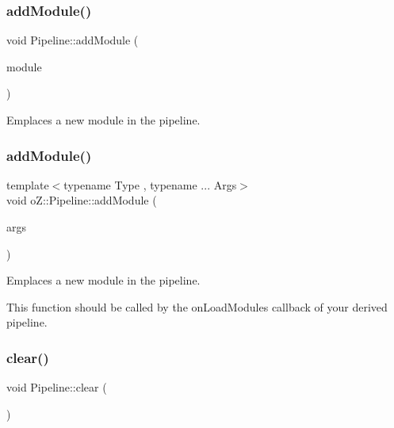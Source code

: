 \subsubsection{\texorpdfstring{addModule()}{addModule()}\hspace{0.1cm}{\footnotesize\ttfamily [1/2]}}
{\footnotesize\ttfamily void Pipeline\+::add\+Module (\begin{DoxyParamCaption}\item[{\mbox{\hyperlink{namespaceo_z_af5a56aaaee027504979038f38991adcf}{Module\+Ptr}} \&\&}]{module }\end{DoxyParamCaption})}



Emplaces a new module in the pipeline. 

\mbox{\label{classo_z_1_1_pipeline_a797f98947aace930fbb15cd6b2d9f726}} 
\subsubsection{\texorpdfstring{addModule()}{addModule()}\hspace{0.1cm}{\footnotesize\ttfamily [2/2]}}
{\footnotesize\ttfamily template$<$typename Type , typename ... Args$>$ \\
void o\+Z\+::\+Pipeline\+::add\+Module (\begin{DoxyParamCaption}\item[{Args \&\&...}]{args }\end{DoxyParamCaption})}



Emplaces a new module in the pipeline. 

This function should be called by the on\+Load\+Modules callback of your derived pipeline. \mbox{\label{classo_z_1_1_pipeline_a7ba573fcba5ea0a749ca1c214bd031f5}} 
\subsubsection{\texorpdfstring{clear()}{clear()}}
{\footnotesize\ttfamily void Pipeline\+::clear (\begin{DoxyParamCaption}\item[{void}]{ }\end{DoxyParamCaption})}



